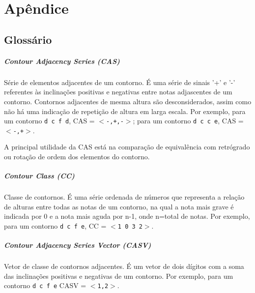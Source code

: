 \documentclass[12pt,brazil]{book}
\begin{document}



\chapter{Apêndice}
\label{cha:apendice}

\section{Glossário}
\label{sec:glossario}

\paragraph{Contour Adjacency Series (CAS)}
\label{sec:cont-adjac-seri}

Série de elementos adjacentes de um contorno. É uma série de sinais
'+' e '-' referentes às inclinações positivas e negativas entre notas
adjascentes de um contorno. Contornos adjacentes de mesma altura são
desconsiderados, assim como não há uma indicação de repetição de
altura em larga escala. Por exemplo, para um contorno \texttt{d c f
  d}, CAS = \texttt{$<$-,+,-$>$}; para um contorno \texttt{d c c e}, CAS =
\texttt{$<$-,+$>$}.

A principal utilidade da CAS está na comparação de equivalência com
retrógrado ou rotação de ordem dos elementos do contorno.

\paragraph{Contour Class (CC)}
\label{sec:contour-class-cc}

Classe de contornos. É uma série ordenada de números que representa a
relação de alturas entre todas as notas de um contorno, na qual a nota
mais grave é indicada por 0 e a nota mais aguda por n-1, onde n=total
de notas. Por exemplo, para um contorno \texttt{d c f e}, CC = \texttt{$<$1 0
3 2$>$}.

\paragraph{Contour Adjacency Series Vector (CASV)}
\label{sec:cont-adjac-seri-1}

Vetor de classe de contornos adjacentes. É um vetor de dois dígitos
com a soma das inclinações positivas e negativas de um contorno. Por
exemplo, para um contorno \texttt{d c f e} CASV = \texttt{$<$1,2$>$}.
\end{document}
